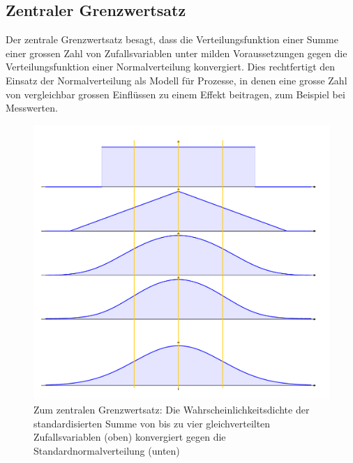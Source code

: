 \documentclass[../Main.tex]{subfiles}
\begin{document}
\subsection{Zentraler Grenzwertsatz}
Der zentrale Grenzwertsatz besagt, dass die Verteilungsfunktion einer Summe einer grossen Zahl 
von Zufallsvariablen unter milden Voraussetzungen gegen die Verteilungsfunktion einer Normalverteilung konvergiert. 
Dies rechtfertigt den Einsatz der Normalverteilung als Modell für Prozesse, in denen eine grosse Zahl 
von vergleichbar grossen Einflüssen zu einem Effekt beitragen, zum Beispiel bei Messwerten.

\begin{figure}[H]
    \centering
    \includegraphics[width=0.5\linewidth]{Images/central-limit.png}
    \caption{Zum zentralen Grenzwertsatz: Die Wahrscheinlichkeitsdichte der standardisierten Summe von
    bis zu vier gleichverteilten Zufallsvariablen (oben) konvergiert gegen die Standardnormalverteilung (unten)}
\end{figure}
\end{document}
